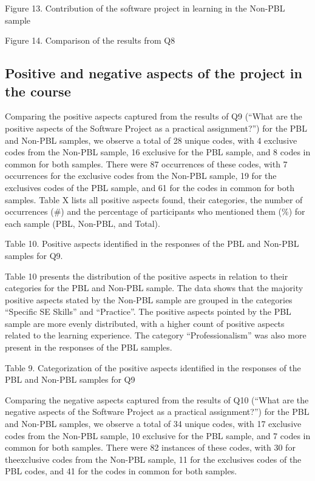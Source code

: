 Figure 13. Contribution of the software project in learning in the Non-PBL sample

Figure 14. Comparison of the results from Q8

\subsection{Positive and negative aspects of the project in the course}

Comparing the positive aspects captured from the results of Q9 (“What are the positive aspects of the Software Project as a practical assignment?”) for the PBL and Non-PBL samples, we observe a total of 28 unique codes, with 4 exclusive codes from the Non-PBL sample, 16 exclusive for the PBL sample, and 8 codes in common for both samples. There were 87 occurrences of these codes, with 7 occurrences for the exclusive codes from the Non-PBL sample, 19 for the exclusives codes of the PBL sample, and 61 for the codes in common for both samples. Table X lists all positive aspects found, their categories, the number of occurrences (#) and the percentage of participants who mentioned them (\%) for each sample (PBL, Non-PBL, and Total).

Table 10. Positive aspects identified in the responses of the PBL and Non-PBL samples for Q9.

Table 10 presents the distribution of the positive aspects in relation to their categories for the PBL and Non-PBL sample. The data shows that the majority positive aspects stated by the Non-PBL sample are grouped in the categories “Specific SE Skills” and “Practice”. The positive aspects pointed by the PBL sample are more evenly distributed, with a higher count of positive aspects related to the learning experience. The category “Professionalism” was also more present in the responses of the PBL samples.

Table 9. Categorization of the positive aspects identified in the responses of the PBL and Non-PBL samples for Q9

Comparing the negative aspects captured from the results of Q10 (“What are the negative aspects of the Software Project as a practical assignment?”) for the PBL and Non-PBL samples, we observe a total of 34 unique codes, with 17 exclusive codes from the Non-PBL sample, 10 exclusive for the PBL sample, and 7 codes in common for both samples. There were 82 instances of these codes, with 30 for theexclusive codes from the Non-PBL sample, 11 for the exclusives codes of the PBL codes, and 41 for the codes in common for both samples. 

